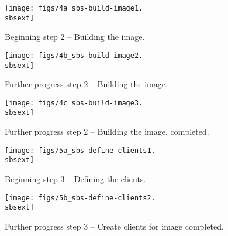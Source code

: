 


\begin{figure}[htbp]
  \begin{center}
    \texttt{[image: figs/4a\_sbs-build-image1.\\sbsext]}
    \caption{Beginning step 2 -- Building the image.}
    \label{fig:sbs-build-image}
  \end{center}
\end{figure}

\begin{figure}[htbp]
  \begin{center}
    \texttt{[image: figs/4b\_sbs-build-image2.\\sbsext]}
    \caption{Further progress step 2 -- Building the image.}
    \label{fig:sbs-build-image-progress}
  \end{center}
\end{figure}


\begin{figure}[htbp]
  \begin{center}
    \texttt{[image: figs/4c\_sbs-build-image3.\\sbsext]}
    \caption{Further progress step 2 -- Building the image, completed.}
    \label{fig:sbs-build-image2}
  \end{center}
\end{figure}

 
\begin{figure}[htbp]
  \begin{center}
    \texttt{[image: figs/5a\_sbs-define-clients1.\\sbsext]}
    \caption{Beginning step 3 -- Defining the clients.}
    \label{fig:sbs-define-clients}
  \end{center}
\end{figure}


\begin{figure}[htbp]
  \begin{center}
    \texttt{[image: figs/5b\_sbs-define-clients2.\\sbsext]}
    \caption{Further progress step 3 -- Create clients for image completed.}
    \label{fig:sbs-define-clients2}
  \end{center}
\end{figure}

